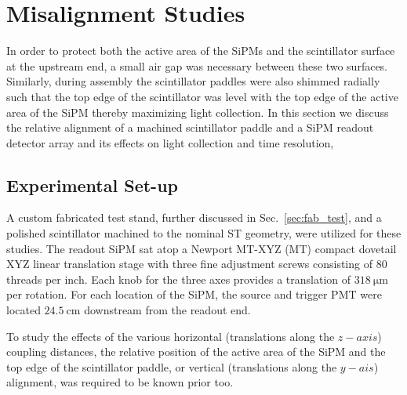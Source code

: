 \section{Misalignment Studies} \label{sec:misalign}

In order to protect both the active area of the SiPMs and the scintillator surface at the upstream end, a small air gap was necessary between these two surfaces.  Similarly, during assembly the scintillator paddles were also shimmed radially such that the top edge of the scintillator was level with the top edge of the active area of the SiPM thereby maximizing light collection.  In this section we discuss the relative alignment of a machined scintillator paddle and a SiPM readout detector array and its effects on light collection and time resolution,

\subsection{Experimental Set-up} \label{sec:misalign_setup}

A custom fabricated test stand, further discussed in Sec.~\ref{sec:fab_test}, and a polished scintillator machined to the nominal ST geometry, were utilized for these studies.  The readout SiPM sat atop a Newport MT-XYZ (MT) compact dovetail XYZ linear translation stage\cite{newport_mt_xyz} with three fine adjustment screws consisting of 80 threads per inch.  Each knob for the three axes provides a translation of $318\ \mathrm{\mu m}$ per rotation.  For each location of the SiPM, the source and trigger PMT were located $\mathrm{24.5~cm}$ downstream from the readout end.

To study the effects of the various horizontal (translations along the $z-axis$) coupling distances, the relative position of the active area of the SiPM and the top edge of the scintillator paddle, or vertical (translations along the $y-ais$) alignment, was required to be known prior too.

